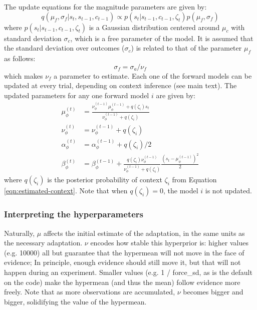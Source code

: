 \documentclass[a4paper,doc,floatsintext,natbib]{apa6}
\def \eref #1{Equation \ref{#1}}   %
\begin{document}
The update equations for the magnitude parameters are given by:
\begin{equation}
q(\mu_f, \sigma_f | s_t, s_{t-1}, c_{t-1}) \propto p(s_t |
s_{t-1}, c_{t-1}, \zeta_t)p(\mu_f, \sigma_f) \label{eqn:context-from-x}
\end{equation}
where $p(s_t | s_{t-1}, c_{t-1}, \zeta_t)$ is a Gaussian distribution centered
around $\mu_c$ with standard deviation $\sigma_c$, which is a free parameter of
the model. It is assumed that the standard deviation over outcomes ($\sigma_c$)
is related to that of the parameter $\mu_f$ as follows:
\begin{equation}
\sigma_f = \sigma_a / \nu_f
\end{equation}
which makes $\nu_f$ a parameter to estimate. Each one of the forward models can
be updated at every trial, depending on context inference (see main text). The
updated parameters for any one forward model $i$ are given by:
\begin{align}
  \mu_\phi^{(t)} &= \frac{\nu_\phi^{(t-1)} \mu_\phi^{(t-1)} + q(\zeta_i)s_t}{\nu_\phi^{(t-1)} + q(\zeta_i)} \\
  \nu_\phi^{(t)} &= \nu_\phi^{(t-1)} + q(\zeta_i) \\
  \alpha_\phi^{(t)} &= \alpha_\phi^{(t-1)} + q(\zeta_i) / 2 \\
  \beta_\phi^{(t)} &= \beta_\phi^{(t-1)} + \frac{q(\zeta_i)\nu_\phi^{(t-1)}}{\nu_\phi^{(t-1)} +
                  q(\zeta_i)}\frac{\left(s_t - \mu_\phi^{(t-1)}\right)^2}{2}
\end{align}
where $q(\zeta_i)$ is the posterior probability of context $\zeta_i$ from
\eref{eqn:estimated-context}. Note that when $q(\zeta_i) = 0$, the model $i$ is not
updated.

\subsubsection{Interpreting the hyperparameters}
\label{sec:interpreting-hyperparameters}
Naturally, $\mu$ affects the initial estimate of the adaptation, in the same
units as the necessary adaptation. $\nu$ encodes how stable this hyperprior is:
higher values (e.g. 10000) all but guarantee that the hypermean will not move
in the face of evidence; In principle, enough evidence should still move it,
but that will not happen during an experiment. Smaller values (e.g. 1 / force\_sd,
as is the default on the code) make the hypermean (and thus the mean) follow
evidence more freely. Note that as more observations are accumulated, $\nu$
becomes bigger and bigger, solidifying the value of the hypermean.
\end{document}
